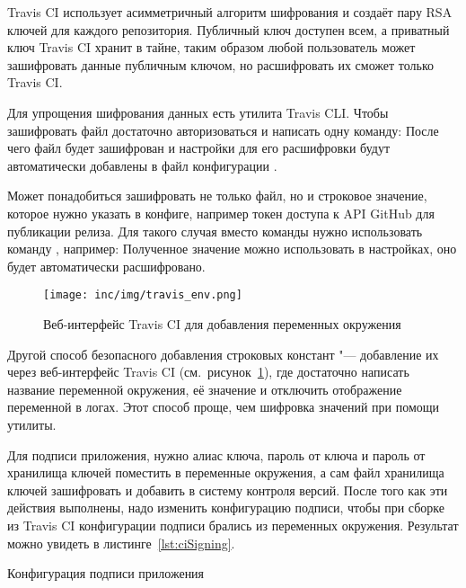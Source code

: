 Travis CI использует асимметричный алгоритм шифрования и создаёт пару RSA ключей для каждого репозитория.
Публичный ключ доступен всем, а приватный ключ Travis CI хранит в тайне, таким образом любой пользователь может зашифровать данные публичным ключом, но расшифровать их сможет только Travis CI\@.

Для упрощения шифрования данных есть утилита Travis CLI\@.
Чтобы зашифровать файл достаточно авторизоваться и написать одну команду:
После чего файл будет зашифрован и настройки для его расшифровки будут автоматически добавлены в файл конфигурации .

Может понадобиться зашифровать не только файл, но и строковое значение, которое нужно указать в конфиге, например токен доступа к API GitHub для публикации релиза.
Для такого случая вместо команды  нужно использовать команду , например:
Полученное значение можно использовать в настройках, оно будет автоматически расшифровано.

\begin{figure}[ht]
  \centering
  \texttt{[image: inc/img/travis\_env.png]}
  \caption{Веб-интерфейс Travis CI для добавления переменных окружения}
  \label{fig:travisEnv}
\end{figure}

Другой способ безопасного добавления строковых констант "--- добавление их через веб-интерфейс Travis CI (см.~рисунок~\ref{fig:travisEnv}), где достаточно написать название переменной окружения, её значение и отключить отображение переменной в логах.
Этот способ проще, чем шифровка значений при помощи утилиты.

Для подписи приложения, нужно алиас ключа, пароль от ключа и пароль от хранилища ключей поместить в переменные окружения, а сам файл хранилища ключей зашифровать и добавить в систему контроля версий.
После того как эти действия выполнены, надо изменить конфигурацию подписи, чтобы при сборке из Travis CI конфигурации подписи брались из переменных окружения.
Результат можно увидеть в листинге~\ref{lst:ciSigning}.

\begin{listing}[h]
  \caption{Конфигурация подписи приложения}
  \label{lst:ciSigning}
\end{listing}

